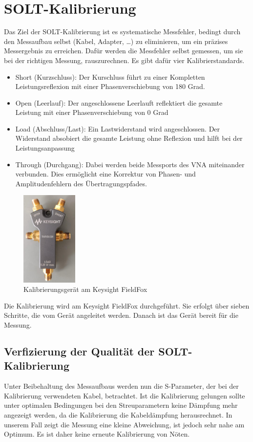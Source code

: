 \section{SOLT-Kalibrierung} 
Das Ziel der SOLT-Kalibrierung ist es systematische Messfehler, bedingt durch den Messaufbau selbst (Kabel, Adapter, …) zu eliminieren, um ein präzises Messergebnis zu erreichen. Dafür werden die Messfehler selbst gemessen, um sie bei der richtigen Messung, rauszurechnen. Es gibt dafür vier Kalibrierstandards.
\begin{itemize}
    \item Short (Kurzschluss): Der Kurschluss führt zu einer Kompletten Leistungsreflexion mit einer Phasenverschiebung von 180 Grad. 
    \item Open (Leerlauf): Der angeschlossene Leerlauft reflektiert die gesamte Leistung mit einer Phasenverschiebung von 0 Grad
    \item Load (Abschluss/Last): Ein Lastwiderstand wird angeschlossen. Der Widerstand absobiert die gesamte Leistung ohne Reflexion und hilft bei der Leistungsanpassung
    \item Through (Durchgang): Dabei werden beide Messports des VNA miteinander verbunden. Dies ermöglicht eine Korrektur von Phasen- und Amplitudenfehlern des Übertragungspfades.
\end{itemize}
\begin{figure}[h]
    \centering
    \includegraphics[width=0.25\textwidth]{Pictures/Keysightkallibrierung.jpg}
    \caption{Kalibrierungsgerät am Keysight FieldFox}
\end{figure}
\clearpage
 
Die Kalibrierung wird am Keysight FieldFox durchgeführt. Sie erfolgt über sieben Schritte, die vom Gerät angeleitet werden. Danach ist das Gerät bereit für die Messung.
\subsection{Verfizierung der Qualität der SOLT-Kalibrierung}
Unter Beibehaltung des Messaufbaus werden nun die S-Parameter, der bei der Kalibrierung verwendeten Kabel, betrachtet. Ist die Kalibrierung gelungen sollte unter optimalen Bedingungen bei den Streuparametern keine Dämpfung mehr angezeigt werden, da die Kalibrierung die Kabeldämpfung herausrechnet. In unserem Fall zeigt die Messung eine kleine Abweichung, ist jedoch sehr nahe am Optimum. Es ist daher keine erneute Kalibrierung von Nöten.

